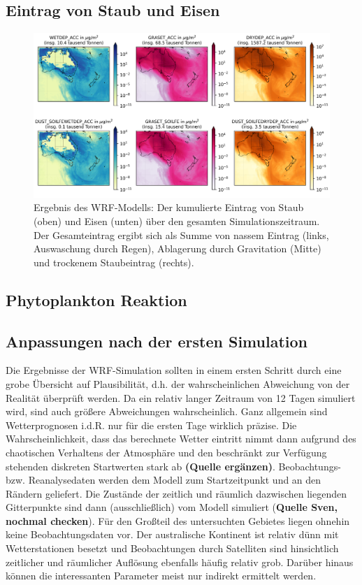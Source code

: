 \documentclass[12pt,a4paper,onecolumn]{scrartcl}
\begin{document}
\subsection{Eintrag von Staub und Eisen}
\begin{figure}[ht]
\includegraphics[width=\textwidth]{bilder/deposition.png}
\caption{Ergebnis des WRF-Modells: Der kumulierte Eintrag von Staub (oben) und Eisen (unten) über den gesamten Simulationszeitraum. Der Gesamteintrag ergibt sich als Summe von nassem Eintrag (links, Auswaschung durch Regen), Ablagerung durch Gravitation (Mitte) und trockenem Staubeintrag (rechts).} \label{fig:deposition}
\end{figure}
\subsection{Phytoplankton Reaktion}
\subsection{Anpassungen nach der ersten Simulation}
Die Ergebnisse der WRF-Simulation sollten in einem ersten Schritt durch eine grobe Übersicht auf Plausibilität, d.h. der wahrscheinlichen Abweichung von der Realität überprüft werden. Da ein relativ langer Zeitraum von 12 Tagen simuliert wird, sind auch größere Abweichungen wahrscheinlich. Ganz allgemein sind Wetterprognosen i.d.R. nur für die ersten Tage wirklich präzise. Die Wahrscheinlichkeit, dass das berechnete Wetter eintritt nimmt dann aufgrund des chaotischen Verhaltens der Atmosphäre und den beschränkt zur Verfügung stehenden diskreten Startwerten stark ab \textbf{(Quelle ergänzen)}. Beobachtungs- bzw. Reanalysedaten werden dem Modell zum Startzeitpunkt und an den Rändern geliefert. Die Zustände der zeitlich und räumlich dazwischen liegenden Gitterpunkte sind dann (ausschließlich) vom Modell simuliert (\textbf{Quelle Sven, nochmal checken}). Für den Großteil des untersuchten Gebietes liegen ohnehin keine Beobachtungsdaten vor. Der australische Kontinent ist relativ dünn mit Wetterstationen besetzt und Beobachtungen durch Satelliten sind hinsichtlich  zeitlicher und räumlicher Auflösung ebenfalls häufig relativ grob. Darüber hinaus können die interessanten Parameter meist nur indirekt ermittelt werden.
\\
\end{document}
